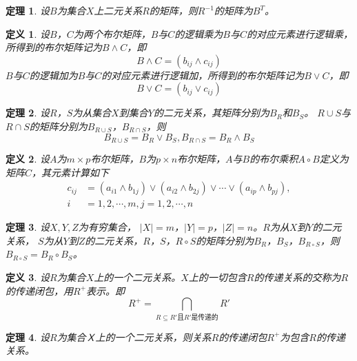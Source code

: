 \documentclass{book}[oneside]
\newtheorem{Def}{定义}[chapter]
\newtheorem{Thm}{定理}[chapter]
\begin{document}
\begin{CJK*}{UTF8}{gbsn}
  \begin{Thm}
    设$B$为集合$X$上二元关系$R$的矩阵，则$R^{-1}$的矩阵为$B^{T}$。
  \end{Thm}


   \begin{Def}
    设$B$，$C$为两个布尔矩阵，$B$与$C$的逻辑乘为$B$与$C$的对应元素进行逻辑乘，所得到的布尔矩阵记为$B \land C$，即
    \begin{equation*}
      B \land C = (b_{ij} \land c_{ij})
    \end{equation*}
    $B$与$C$的逻辑加为$B$与$C$的对应元素进行逻辑加，所得到的布尔矩阵记为$B \lor C$，即
    \begin{equation*}
      B \lor C = (b_{ij} \lor c_{ij})
    \end{equation*}
  \end{Def}
  \begin{Thm}
    设$R$，$S$为从集合$X$到集合$Y$的二元关系，其矩阵分别为$B_R$和$B_S$。 $R\cup S$与$R \cap S$的矩阵分别为$B_{R\cup S}$，$B_{R\cap S}$，则
    \begin{equation*}
      B_{R\cup S}=B_R \lor B_S, B_{R\cap S}=B_R \land B_S
    \end{equation*}
  \end{Thm}
  \begin{Def}
    设$A$为$m\times p$布尔矩阵，$B$为$p \times n$布尔矩阵，$A$与$B$的布尔乘积$A \circ B$定义为矩阵$C$，其元素计算如下
    \begin{align*}
      c_{ij} &= (a_{i1}\land b_{1j}) \lor (a_{i2} \land b_{2j}) \lor \cdots \lor (a_{ip} \land b_{pj}), \\
      i &= 1,2,\cdots, m, j = 1,2,\cdots, n
    \end{align*}
  \end{Def}
  \begin{Thm}
    设$X, Y, Z$为有穷集合， $|X| =m$，$|Y|=p$，$|Z| = n$。$R$为从$X$到$Y$的二元
    关系， $S$为从$Y$到$Z$的二元关系，$R$，$S$，$R \circ S$的矩阵分别为$B_{R}$，$B_{S}$，$B_{R\circ S}$，则$B_{R\circ S} = B_R \circ B_S$。
  \end{Thm}
  \begin{Def}
    设$R$为集合$X$上的一个二元关系。$X$上的一切包含$R$的传递关系的交称为$R$的传递闭包，用$R^+$表示。即
    \begin{equation*}
      R^+ = \bigcap_{R \subseteq R' \text{且} R'\text{是传递的}}R'
    \end{equation*}
  \end{Def}
  \begin{Thm}
    设$R$为集合Ｘ上的一个二元关系，则关系$R$的传递闭包$R^+$为包含$R$的传递关系。
  \end{Thm}


\end{CJK*}
\end{document}
